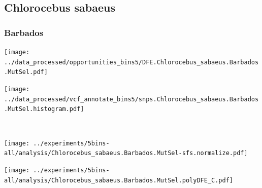 \subsection{Chlorocebus sabaeus}

\subsubsection{Barbados}

\begin{minipage}{0.49\linewidth}
    \texttt{[image: ../data\_processed/opportunities\_bins5/DFE.Chlorocebus\_sabaeus.Barbados.MutSel.pdf]}
\end{minipage}
\begin{minipage}{0.49\linewidth}
    \texttt{[image: ../data\_processed/vcf\_annotate\_bins5/snps.Chlorocebus\_sabaeus.Barbados.MutSel.histogram.pdf]}
\end{minipage}
\\
\begin{minipage}{0.49\linewidth}
    \texttt{[image: ../experiments/5bins-all/analysis/Chlorocebus\_sabaeus.Barbados.MutSel-sfs.normalize.pdf]}
\end{minipage}
\begin{minipage}{0.4\linewidth}
    \texttt{[image: ../experiments/5bins-all/analysis/Chlorocebus\_sabaeus.Barbados.MutSel.polyDFE\_C.pdf]}
\end{minipage}
